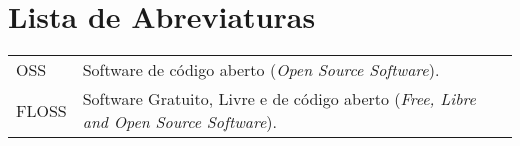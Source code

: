 \documentclass[11pt,twoside,letterpaper]{book}
\begin{document}
\tableofcontents %


\chapter{Lista de Abreviaturas}
\begin{tabular}{ll}
 		OSS         & Software de código aberto (\emph{Open Source Software}).\\
 		FLOSS       & Software Gratuito, Livre e de código aberto (\emph{Free, Libre and Open Source Software}).\\
\end{tabular}


\listoffigures               %
\listoftables                %

\mainmatter

\onehalfspacing              %

\appendix

\backmatter \singlespacing   %




\printindex   %
\end{document}
